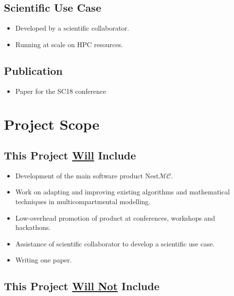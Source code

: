 \documentclass[11pt,a4paper]{article}
\newcommand{\nestmc}[0]{Nest$\mathcal{MC}$\xspace}
\begin{document}
\subsection{Scientific Use Case}

\begin{itemize}
    \item   Developed by a scientific collaborator.
    \item   Running at scale on HPC resources.
\end{itemize}

\subsection{Publication}

\begin{itemize}
    \item   Paper for the SC18 conference
\end{itemize}

\section{Project Scope}
\subsection{This Project \underline{Will} Include}

\begin{itemize}
    \item Development of the main software product \nestmc.
    \item Work on adapting and improving existing algorithms and mathematical techniques in multicompartmental modelling.
    \item Low-overhead promotion of product at conferences, workshops and hackathons.
    \item Assistance of scientific collaborator to develop a scientific use case.
    \item Writing one paper.
\end{itemize}

\subsection{This Project \underline{Will Not} Include}
\end{document}
